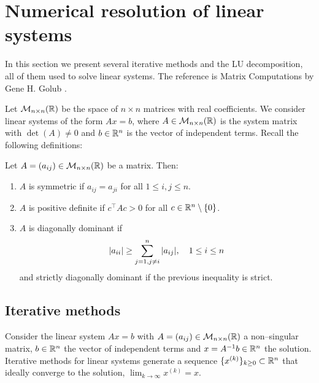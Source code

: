 
\section{Numerical resolution of linear systems} \label{ap:numerical_resolution_linear_systems}

In this section we present several iterative methods and the LU decomposition,
all of them used to solve linear systems. The reference is Matrix Computations
by Gene H. Golub \cite{golub2013matrix}.

Let $\mathcal{M}_{n \times n}(\mathbb{R})$ be the space of $n \times n$ matrices with
real coefficients. We consider linear systems of the form $A x = b$, where $A
\in \mathcal{M}_{n \times n}(\mathbb{R})$ is the system matrix with $\det(A) \neq 0$
and $b \in \mathbb{R}^n$ is the vector of independent terms. Recall the following
definitions:

\begin{definition*}
    Let $A = (a_{ij}) \in \mathcal{M}_{n \times n}(\mathbb{R})$ be a matrix. Then:
    \begin{enumerate}[label={(\roman*)}, topsep=0pt]
        \item $A$ is symmetric if $a_{ij} = a_{ji}$ for all $1 \leq i, j \leq n$.
        \item $A$ is positive definite if $c^\top A c > 0$ for all $c \in \mathbb{R}^n \setminus \{ 0 \}$.
        \item $A$ is diagonally dominant if
        \begin{equation*}
            \abs{a_{ii}} \geq \sum_{\substack{j = 1, j \neq i}}^n \abs{a_{ij}}, 
            \quad 1 \leq i \leq n
        \end{equation*}
        and strictly diagonally dominant if the previous inequality is strict.
    \end{enumerate}
\end{definition*}

\subsection{Iterative methods}

Consider the linear system $A x = b$ with $A = (a_{ij}) \in \mathcal{M}_{n
\times n}(\mathbb{R})$ a non--singular matrix, $b \in \mathbb{R}^n$ the vector of
independent terms and $x = A^{-1} b \in \mathbb{R}^n$ the solution. Iterative methods
for linear systems generate a sequence $\{ x^{(k)} \}_{k \geq 0} \subset
\mathbb{R}^n$ that ideally converge to the solution, \ie $\lim_{k \to \infty} x^{(k)}
= x$. 

